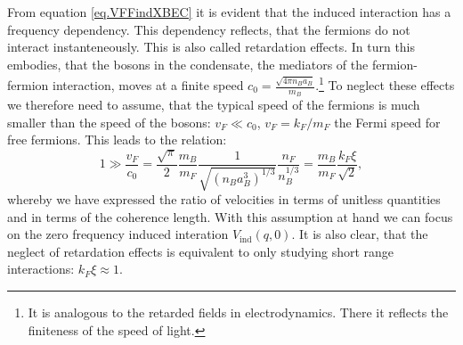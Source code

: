 From equation \eqref{eq.VFFindXBEC} it is evident that the induced interaction has a frequency dependency. This dependency reflects, that the fermions do not interact instanteneously. This is also called retardation effects. In turn this embodies, that the bosons in the condensate, the mediators of the fermion-fermion interaction, moves at a finite speed $c_0 = \frac{\sqrt{4\pi n_B a_B}}{m_B}$.\footnote{It is analogous to the retarded fields in electrodynamics. There it reflects the finiteness of the speed of light.} To neglect these effects we therefore need to assume, that the typical speed of the fermions is much smaller than the speed of the bosons: $v_F \ll c_0$, $v_F = k_F/m_F$ the Fermi speed for free fermions. This leads to the relation:
\begin{equation}
1 \gg \frac{v_F}{c_0} = \frac{\sqrt{\pi}}{2} \frac{m_B}{m_F}\frac{1}{ \sqrt{ (n_Ba_B^3)^{1/3} } }\frac{n_F}{ n_B^{1/3} } = \frac{m_B}{m_F}\frac{k_F\xi}{\sqrt{2}}, 
\label{eq.RetardationEffectsneglectionassumption}
\end{equation}
whereby we have expressed the ratio of velocities in terms of unitless quantities and in terms of the coherence length. With this assumption at hand we can focus on the zero frequency induced interation $V_{\text{ind}}(q,0)$. It is also clear, that the neglect of retardation effects is equivalent to only studying short range interactions: $k_F\xi \approx 1$. 

